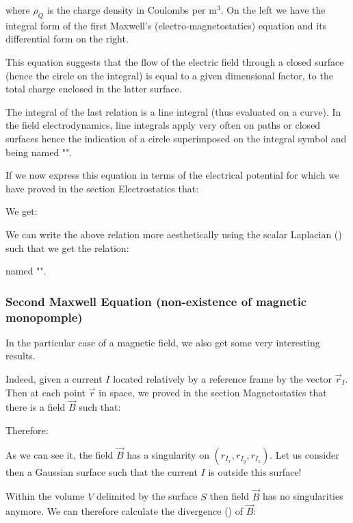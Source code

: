 	where $\rho_Q$ is the charge density in Coulombs per $\text{m}^3$. On the left we have the integral form of the first Maxwell's (electro-magnetostatics) equation and its differential form on the right.
	
	This equation suggests that the flow of the electric field through a closed surface (hence the circle on the integral) is equal to a given dimensional factor, to the total charge enclosed in the latter surface.
	\begin{tcolorbox}[title=Remark,colframe=black,arc=10pt]
	The integral of the last relation is a line integral (thus evaluated on a curve). In the field electrodynamics, line integrals  apply very often on paths or closed surfaces hence the indication of a circle superimposed on the integral symbol and being named "".
	\end{tcolorbox}	
	If we now express this equation in terms of the electrical potential for which we have proved in the section Electrostatics that:
	
	We get:
	
	We can write the above relation more aesthetically using the scalar Laplacian () such that we get the relation:
	
	named "".
	
	\subsubsection{Second Maxwell Equation (non-existence of magnetic monopomple)}
	In the particular case of a magnetic field, we also get some very interesting results.
	
	Indeed, given a current $I$ located relatively by a reference frame by the vector $\vec{r}_I$. Then at each point $\vec{r}$ in space, we proved in the section Magnetostatics that there is a field $\vec{B}$ such that:
	
	Therefore:
	
	As we can see it, the field $\vec{B}$ has a singularity on $(r_{I_x},r_{I_y},r_{I_z})$. Let us consider then a Gaussian surface such that the current $I$ is outside this surface!

	Within the volume $V$ delimited by the surface $S$ then field $\vec{B}$ has no singularities anymore. We can therefore calculate the divergence () of $\vec{B}$:
	
